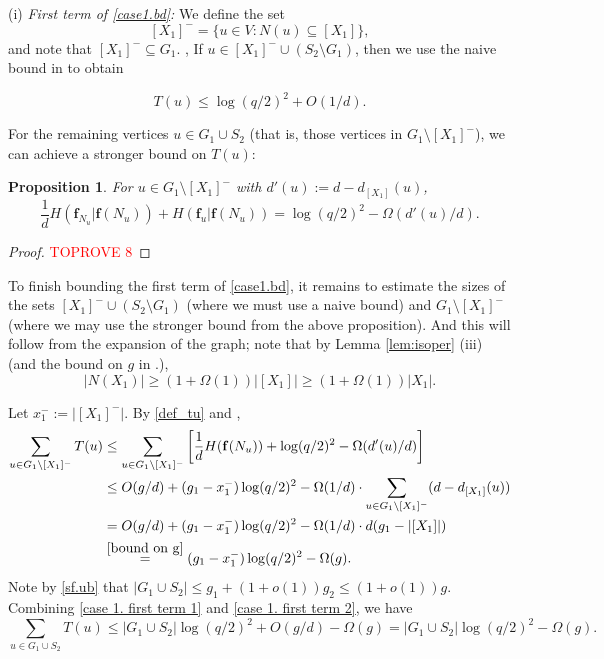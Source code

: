 \documentclass{amsart}
\newtheorem{prop}[thm]{Proposition}
\theoremstyle{definition}
\newcommand{\gO}{\Omega}
\newcommand{\bbf}{\mathbf{f}}
\newcommand{\beq}[1]{\begin{equation}\label{#1}}
\newcommand{\enq}[0]{\end{equation}}
\newcommand{\nin}[0]{\noindent}
\newcommand{\sub}[0]{\subseteq}
\newcommand{\0}[0]{\emptyset}
\newcommand{\qq}[0]{(q/2)^2}
\begin{document}
\nin (i) \textit{First term of \eqref{case1.bd}:} We define the set
\begin{equation}\label{xminus}
[X_1]^-=\{u \in V: N(u) \sub [X_1]\},
\end{equation} 
and note that $[X_1]^-\subseteq G_1$. , 
If $u \in [X_1]^- \cup (S_2 \setminus G_1)$, then we use the naive bound in  to obtain

\beq{case 1. first term 1} T(u) \le \log \qq +O(1/d).\enq

For the remaining vertices $u\in G_1\cup S_2$ (that is, those vertices in $G_1\setminus [X_1]^-$), we can achieve a stronger bound on $T(u)$:

\begin{prop}\label{prop5.3} 
	For $u \in G_1 \setminus [X_1]^-$               with $d'(u):=d-d_{[X_1]}(u)$,
\[ \frac{1}{d}H(\bbf_{N_u}|\bbf(N_u))+H(\bbf_u|\bbf(N_u))=\log \qq-\gO(d'(u)/d). \]
\end{prop}



\begin{proof}\textcolor{red}{TOPROVE 8}\end{proof}

To finish bounding the first term of \eqref{case1.bd}, it remains to estimate the sizes of the sets $[X_1]^- \cup (S_2 \setminus G_1)$ (where we must use a naive bound) and $G_1\setminus [X_1]^-$ (where we may use the stronger bound from the above proposition). And this will follow from the expansion of the graph; note that by Lemma \ref{lem:isoper} (iii) (and the bound on $g$ in .), 
\beq{bound on g} |N(X_1)|\ge (1+\gO(1))|[X_1]|\ge (1+\gO(1))|X_1|. \enq

Let $x_1^-:=|[X_1]^-|$. By \eqref{def_tu} and ,
\beq{case 1. first term 2}\begin{split}\sum_{u \in G_1 \setminus [X_1]^-}T(u) &\le \sum_{u \in G_1 \setminus [X_1]^-} \left[ \frac{1}{d}H(\bbf(N_u))+\log \qq-\gO(d'(u)/d)\right]\\
&\le O(g/d) +(g_1-x_1^-)\log \qq -\gO(1/d)\cdot\sum_{u \in G_1 \setminus [X_1]^-}(d-d_{[X_1]}(u))\\
&=O(g/d)+(g_1-x_1^-)\log \qq-\gO(1/d)\cdot d(g_1-|[X_1]|)\\
&\stackrel{\eqref{bound on g}}{=}(g_1-x_1^-)\log\qq-\gO(g).\end{split}\enq
Note by \eqref{sf.ub} that $|G_1 \cup S_2|\leq g_1+(1 + o(1))g_2\leq (1 + o(1))g$.
Combining \eqref{case 1. first term 1} and \eqref{case 1. first term 2}, we have
\[\sum_{u \in G_1\cup S_2} T(u) \le |G_1 \cup S_2|\log \qq + O(g/d)-\gO(g)= |G_1 \cup S_2|\log \qq - \gO(g).\]
\end{document}
